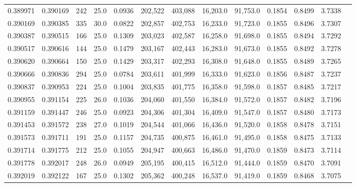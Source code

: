\begin{tabular}{rrrrrrrrrrrrr}
0.389971 & 0.390169 &   242 & 25.0 &                                     0.0936 & 202,522 & 403,088 &  16,203.0 &  91,753.0 & 0.1854 & 0.8499 & 3.7338 \\
0.390169 & 0.390385 &   335 & 30.0 &                                     0.0822 & 202,857 & 402,753 &  16,233.0 &  91,723.0 & 0.1855 & 0.8496 & 3.7307 \\
0.390387 & 0.390515 &   166 & 25.0 &                                     0.1309 & 203,023 & 402,587 &  16,258.0 &  91,698.0 & 0.1855 & 0.8494 & 3.7292 \\
0.390517 & 0.390616 &   144 & 25.0 &                                     0.1479 & 203,167 & 402,443 &  16,283.0 &  91,673.0 & 0.1855 & 0.8492 & 3.7278 \\
0.390620 & 0.390664 &   150 & 25.0 &                                     0.1429 & 203,317 & 402,293 &  16,308.0 &  91,648.0 & 0.1855 & 0.8489 & 3.7265 \\
0.390666 & 0.390836 &   294 & 25.0 &                                     0.0784 & 203,611 & 401,999 &  16,333.0 &  91,623.0 & 0.1856 & 0.8487 & 3.7237 \\
0.390837 & 0.390953 &   224 & 25.0 &                                     0.1004 & 203,835 & 401,775 &  16,358.0 &  91,598.0 & 0.1857 & 0.8485 & 3.7217 \\
0.390955 & 0.391154 &   225 & 26.0 &                                     0.1036 & 204,060 & 401,550 &  16,384.0 &  91,572.0 & 0.1857 & 0.8482 & 3.7196 \\
0.391159 & 0.391447 &   246 & 25.0 &                                     0.0923 & 204,306 & 401,304 &  16,409.0 &  91,547.0 & 0.1857 & 0.8480 & 3.7173 \\
0.391453 & 0.391572 &   238 & 27.0 &                                     0.1019 & 204,544 & 401,066 &  16,436.0 &  91,520.0 & 0.1858 & 0.8478 & 3.7151 \\
0.391573 & 0.391711 &   191 & 25.0 &                                     0.1157 & 204,735 & 400,875 &  16,461.0 &  91,495.0 & 0.1858 & 0.8475 & 3.7133 \\
0.391714 & 0.391775 &   212 & 25.0 &                                     0.1055 & 204,947 & 400,663 &  16,486.0 &  91,470.0 & 0.1859 & 0.8473 & 3.7114 \\
0.391778 & 0.392017 &   248 & 26.0 &                                     0.0949 & 205,195 & 400,415 &  16,512.0 &  91,444.0 & 0.1859 & 0.8470 & 3.7091 \\
0.392019 & 0.392122 &   167 & 25.0 &                                     0.1302 & 205,362 & 400,248 &  16,537.0 &  91,419.0 & 0.1859 & 0.8468 & 3.7075 \\

\end{tabular}
